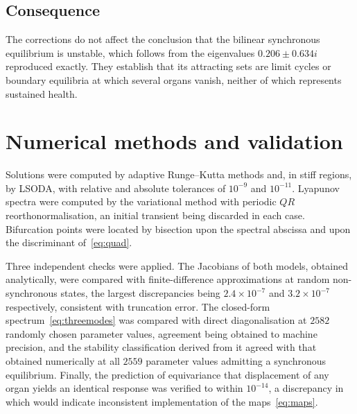 \documentclass[11pt]{article}
\theoremstyle{definition}
\theoremstyle{remark}
\begin{document}
	\subsection*{Consequence}
	
	The corrections do not affect the conclusion that the bilinear synchronous
	equilibrium is unstable, which follows from the eigenvalues $0.206\pm0.634i$
	reproduced exactly. They establish that its attracting sets are limit cycles or
	boundary equilibria at which several organs vanish, neither of which represents
	sustained health.
	
	\section{Numerical methods and validation}\label{app:numerics}
	
	Solutions were computed by adaptive Runge--Kutta methods and, in stiff regions, by
	LSODA, with relative and absolute tolerances of $10^{-9}$ and $10^{-11}$. Lyapunov
	spectra were computed by the variational method with periodic $QR$
	reorthonormalisation, an initial transient being discarded in each case. Bifurcation
	points were located by bisection upon the spectral abscissa and upon the
	discriminant of~\eqref{eq:quad}.
	
	Three independent checks were applied. The Jacobians of both models, obtained
	analytically, were compared with finite-difference approximations at random
	non-synchronous states, the largest discrepancies being $2.4\times10^{-7}$ and
	$3.2\times10^{-7}$ respectively, consistent with truncation error. The closed-form
	spectrum~\eqref{eq:threemodes} was compared with direct diagonalisation at $2582$
	randomly chosen parameter values, agreement being obtained to machine precision, and
	the stability classification derived from it agreed with that obtained numerically
	at all $2559$ parameter values admitting a synchronous equilibrium. Finally, the
	prediction of equivariance that displacement of any organ yields an identical
	response was verified to within $10^{-14}$, a discrepancy in which would indicate
	inconsistent implementation of the maps~\eqref{eq:maps}.
	
	\printbibliography
	
\end{document}
